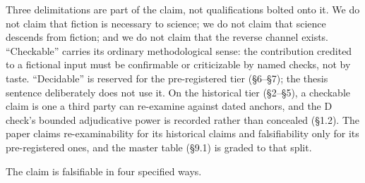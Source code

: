 \documentclass[11pt,a4paper]{article}
\begin{document}
Three delimitations are part of the claim, not qualifications bolted onto it. We do not claim that fiction is necessary to science; we do not claim that science descends from fiction; and we do not claim that the reverse channel exists. ``Checkable'' carries its ordinary methodological sense: the contribution credited to a fictional input must be confirmable or criticizable by named checks, not by taste. ``Decidable'' is reserved for the pre-registered tier (§6–§7); the thesis sentence deliberately does not use it. On the historical tier (§2–§5), a checkable claim is one a third party can re-examine against dated anchors, and the D check's bounded adjudicative power is recorded rather than concealed (§1.2). The paper claims re-examinability for its historical claims and falsifiability only for its pre-registered ones, and the master table (§9.1) is graded to that split.

The claim is falsifiable in four specified ways.
\end{document}
